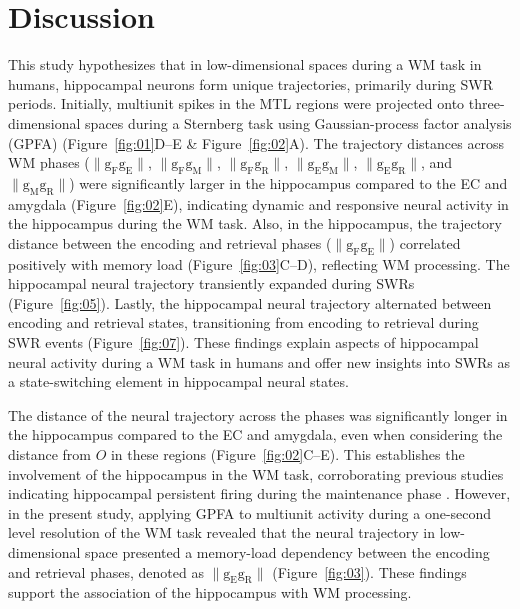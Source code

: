 \documentclass[final,3p,times,twocolumn]{elsarticle}
\begin{document}
\section{Discussion}
This study hypothesizes that in low-dimensional spaces during a WM task in humans, hippocampal neurons form unique trajectories, primarily during SWR periods. Initially, multiunit spikes in the MTL regions were projected onto three-dimensional spaces during a Sternberg task using Gaussian-process factor analysis (GPFA) (Figure~\ref{fig:01}D--E \& Figure~\ref{fig:02}A). The trajectory distances across WM phases ($\mathrm{\lVert g_{F}g_{E} \rVert}$, $\mathrm{\lVert g_{F}g_{M} \rVert}$, $\mathrm{\lVert g_{F}g_{R} \rVert}$, $\mathrm{\lVert g_{E}g_{M} \rVert}$, $\mathrm{\lVert g_{E}g_{R} \rVert}$, and $\mathrm{\lVert g_{M}g_{R} \rVert}$) were significantly larger in the hippocampus compared to the EC and amygdala (Figure~\ref{fig:02}E), indicating dynamic and responsive neural activity in the hippocampus during the WM task. Also, in the hippocampus, the trajectory distance between the encoding and retrieval phases ($\mathrm{\lVert g_{F}g_{E} \rVert}$) correlated positively with memory load (Figure~\ref{fig:03}C--D), reflecting WM processing. The hippocampal neural trajectory transiently expanded during SWRs (Figure~\ref{fig:05}). Lastly, the hippocampal neural trajectory alternated between encoding and retrieval states, transitioning from encoding to retrieval during SWR events (Figure~\ref{fig:07}). These findings explain aspects of hippocampal neural activity during a WM task in humans and offer new insights into SWRs as a state-switching element in hippocampal neural states.

The distance of the neural trajectory across the phases was significantly longer in the hippocampus compared to the EC and amygdala, even when considering the distance from $O$ in these regions (Figure~\ref{fig:02}C--E). This establishes the involvement of the hippocampus in the WM task, corroborating previous studies indicating hippocampal persistent firing during the maintenance phase \cite{boran_persistent_2019} \cite{kaminski_persistently_2017} \cite{kornblith_persistent_2017} \cite{faraut_dataset_2018}. However, in the present study, applying GPFA to multiunit activity during a one-second level resolution of the WM task revealed that the neural trajectory in low-dimensional space presented a memory-load dependency between the encoding and retrieval phases, denoted as $\mathrm{\lVert g_{E}g_{R} \rVert}$ (Figure~\ref{fig:03}). These findings support the association of the hippocampus with WM processing.
\end{document}
